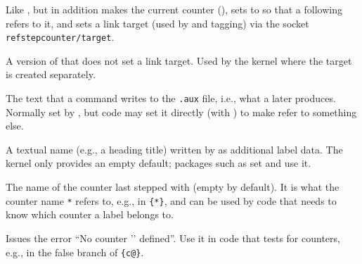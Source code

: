 \documentclass{l3in2edoc}
\begin{document}
\begin{function}[user]
  {
  }
  \begin{syntax}
     
  \end{syntax}
  Like , but in addition makes  the current
  counter (), sets  to
   so that a following 
  refers to it, and sets a link target (used by  and
  tagging) via the socket \texttt{refstepcounter/target}.
\end{function}


\begin{function}[]
  {
    \@kernel@refstepcounter
  }
  \begin{syntax}
     
  \end{syntax}
  A version of  that does not set a link target.
  Used by the kernel where the target is created separately.
\end{function}



\begin{variable}[]
  {
    \@currentlabel
  }
  The text that a  command writes to the \texttt{.aux} file,
  i.e., what a later  produces. Normally set by
  , but code may set it directly (with
  ) to make  refer to something else.
\end{variable}



\begin{variable}[]
  {
    \@currentlabelname
  }
  A textual name (e.g., a heading title) written by  as
  additional label data. The kernel only provides an empty default;
  packages such as  set and use it.
\end{variable}


\begin{variable}[]
  {
    \@currentcounter
  }
  The name of the counter last stepped with  (empty
  by default). It is what the counter name \texttt{*} refers to, e.g.,
  in \texttt{\{*\}}, and can be used by code that needs to know
  which counter a label belongs to.
\end{variable}





\begin{function}[]
  {
    \@nocounterr
  }
  \begin{syntax}
     
  \end{syntax}
  Issues the error \enquote{No counter '' defined}. Use it
  in code that tests for counters, e.g., in the false branch of
  \texttt{\{c@\}}.
\end{function}
\end{document}
